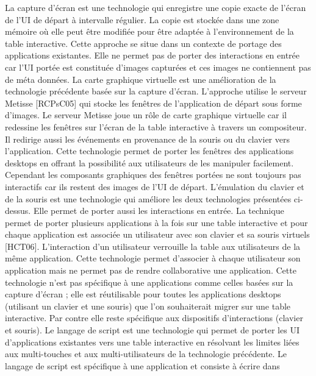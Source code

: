 \documentclass{article}
\begin{document}
La capture d’\'{e}cran
est une technologie qui enregistre une copie exacte de l’\'{e}cran de l’UI de d\'{e}part
\`{a} intervalle r\'{e}gulier. La copie est stock\'{e}e dans une zone m\'{e}moire o\`{u} elle peut \^{e}tre modiﬁ\'{e}e pour \^{e}tre
adapt\'{e}e \`{a} l’environnement de la table interactive. Cette approche se situe dans un contexte de portage
des applications existantes. Elle ne permet pas de porter des interactions en entr\'{e}e car l’UI port\'{e}e est
constitu\'{e}e d’images captur\'{e}es et ces images ne contiennent pas de m\'{e}ta donn\'{e}es.
La carte graphique virtuelle
est une am\'{e}lioration de la technologie pr\'{e}c\'{e}dente bas\'{e}e sur la capture
d’\'{e}cran. L’approche utilise le serveur Metisse [RCPsC05] qui stocke les fen\^{e}tres de l’application
de d\'{e}part sous forme d’images. Le serveur Metisse joue un r\^{o}le de carte graphique virtuelle car il
redessine les fen\^{e}tres sur l’\'{e}cran de la table interactive \`{a} travers un compositeur. Il redirige aussi les
\'{e}v\'{e}nements en provenance de la souris ou du clavier vers l’application. Cette technologie permet de
porter les fen\^{e}tres des applications desktops en offrant la possibilit\'{e} aux utilisateurs de les manipuler
facilement. Cependant les composants graphiques des fen\^{e}tres port\'{e}es ne sont toujours pas interactifs
car ils restent des images de l’UI de d\'{e}part.
L’\'{e}mulation du clavier et de la souris
est une technologie qui am\'{e}liore les deux technologies
pr\'{e}sent\'{e}es ci-dessus. Elle permet de porter aussi les interactions en entr\'{e}e. La technique permet de
porter plusieurs applications \`{a} la fois sur une table interactive et pour chaque application est associ\'{e}e
un utilisateur avec son clavier et sa souris virtuels [HCT06]. L’interaction d’un utilisateur verrouille la
table aux utilisateurs de la m\^{e}me application. Cette technologie permet d’associer \`{a} chaque utilisateur
son application mais ne permet pas de rendre collaborative une application. Cette technologie n’est
pas sp\'{e}ciﬁque \`{a} une applications comme celles bas\'{e}es sur la capture d’\'{e}cran ; elle est r\'{e}utilisable pour
toutes les applications desktops (utilisant un clavier et une souris) que l’on souhaiterait migrer sur une
table interactive. Par contre elle reste sp\'{e}ciﬁque aux dispositifs d’interactions (clavier et souris).
Le langage de script
est une technologie qui permet de porter les UI d’applications existantes vers
une table interactive en r\'{e}solvant les limites li\'{e}es aux multi-touches et aux multi-utilisateurs de la
technologie pr\'{e}c\'{e}dente. Le langage de script est sp\'{e}ciﬁque \`{a} une application et consiste \`{a} \'{e}crire dans
\end{document}
